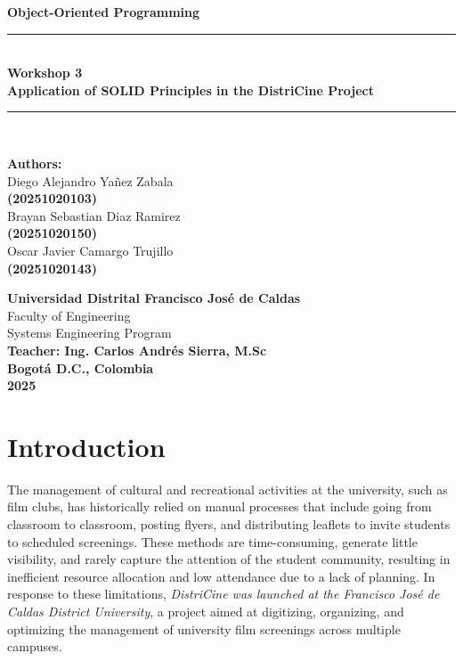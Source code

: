 \documentclass[12pt, letterpaper]{article}
\begin{document}
\begin{titlepage}
    \centering
    \vspace*{-1.5cm}
    
    {\LARGE \textbf{Object-Oriented Programming}}\\[0.5cm]
    \rule{\textwidth}{1pt}\\[0.5cm]
    {\Huge \textbf{Workshop 3}}\\[0.3cm]
    {\Large \textbf{Application of SOLID Principles in the DistriCine Project}}\\[0.5cm]
    \rule{\textwidth}{1pt}\\[1.5cm]
    
    \begin{minipage}{0.8\textwidth}
        \centering
        \large
        \textbf{Authors:}\\[0.3cm]
        Diego Alejandro Yañez Zabala\\
        \textbf{(20251020103)}\\[0.2cm]
        Brayan Sebastian Diaz Ramirez\\
        \textbf{(20251020150)}\\[0.2cm]
        Oscar Javier Camargo Trujillo\\
        \textbf{(20251020143)}\\[1.5cm]
    \end{minipage}
    
    \vfill
    
    \begin{minipage}{0.8\textwidth}
        \centering
        \large
        \textbf{Universidad Distrital Francisco José de Caldas}\\
        Faculty of Engineering\\
        Systems Engineering Program\\[0.5cm]
        \textbf{Teacher: Ing. Carlos Andrés Sierra, M.Sc}\\[0.5cm]
        \textbf{Bogotá D.C., Colombia}\\
        \textbf{2025}
    \end{minipage}
\end{titlepage}

\section{Introduction}

The management of cultural and recreational activities at the university, such as film clubs, has historically relied on manual processes that include going from classroom to classroom, posting flyers, and distributing leaflets to invite students to scheduled screenings. These methods are time-consuming, generate little visibility, and rarely capture the attention of the student community, resulting in inefficient resource allocation and low attendance due to a lack of planning. In response to these limitations, \emph{DistriCine was launched at the Francisco José de Caldas District University}, a project aimed at digitizing, organizing, and optimizing the management of university film screenings across multiple campuses.
\end{document}
